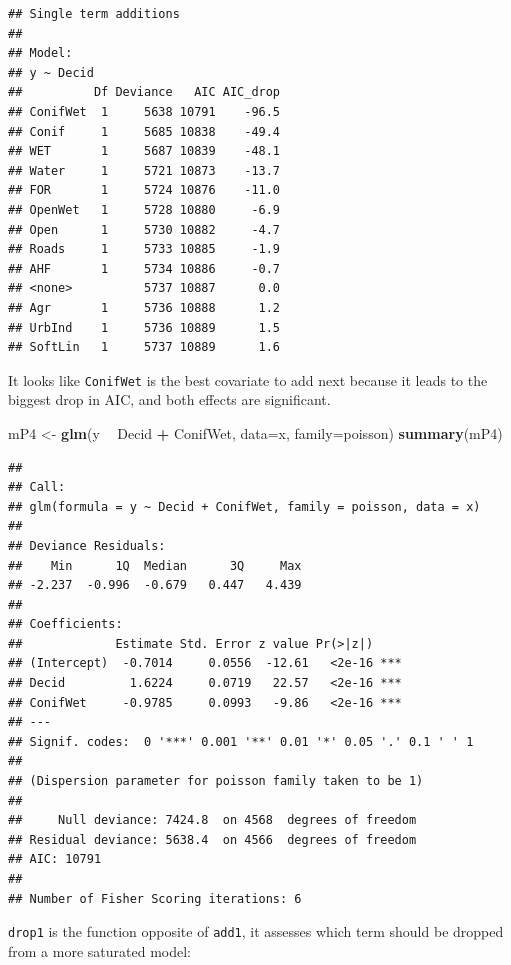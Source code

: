 \documentclass[12pt,]{book}
\newenvironment{Shaded}{\begin{snugshade}}{\end{snugshade}}
\newcommand{\DataTypeTok}[1]{\textcolor[rgb]{0.13,0.29,0.53}{#1}}
\newcommand{\KeywordTok}[1]{\textcolor[rgb]{0.13,0.29,0.53}{\textbf{#1}}}
\newcommand{\NormalTok}[1]{#1}
\newcommand{\OperatorTok}[1]{\textcolor[rgb]{0.81,0.36,0.00}{\textbf{#1}}}
\newcommand{\StringTok}[1]{\textcolor[rgb]{0.31,0.60,0.02}{#1}}
\begin{document}
\begin{verbatim}
## Single term additions
## 
## Model:
## y ~ Decid
##          Df Deviance   AIC AIC_drop
## ConifWet  1     5638 10791    -96.5
## Conif     1     5685 10838    -49.4
## WET       1     5687 10839    -48.1
## Water     1     5721 10873    -13.7
## FOR       1     5724 10876    -11.0
## OpenWet   1     5728 10880     -6.9
## Open      1     5730 10882     -4.7
## Roads     1     5733 10885     -1.9
## AHF       1     5734 10886     -0.7
## <none>          5737 10887      0.0
## Agr       1     5736 10888      1.2
## UrbInd    1     5736 10889      1.5
## SoftLin   1     5737 10889      1.6
\end{verbatim}

It looks like \texttt{ConifWet} is the best covariate to add next because it leads to the biggest drop in AIC,
and both effects are significant.

\begin{Shaded}
\begin{Highlighting}[]
\NormalTok{mP4 <-}\StringTok{ }\KeywordTok{glm}\NormalTok{(y }\OperatorTok{~}\StringTok{ }\NormalTok{Decid }\OperatorTok{+}\StringTok{ }\NormalTok{ConifWet, }\DataTypeTok{data=}\NormalTok{x, }\DataTypeTok{family=}\NormalTok{poisson)}
\KeywordTok{summary}\NormalTok{(mP4)}
\end{Highlighting}
\end{Shaded}

\begin{verbatim}
## 
## Call:
## glm(formula = y ~ Decid + ConifWet, family = poisson, data = x)
## 
## Deviance Residuals: 
##    Min      1Q  Median      3Q     Max  
## -2.237  -0.996  -0.679   0.447   4.439  
## 
## Coefficients:
##             Estimate Std. Error z value Pr(>|z|)    
## (Intercept)  -0.7014     0.0556  -12.61   <2e-16 ***
## Decid         1.6224     0.0719   22.57   <2e-16 ***
## ConifWet     -0.9785     0.0993   -9.86   <2e-16 ***
## ---
## Signif. codes:  0 '***' 0.001 '**' 0.01 '*' 0.05 '.' 0.1 ' ' 1
## 
## (Dispersion parameter for poisson family taken to be 1)
## 
##     Null deviance: 7424.8  on 4568  degrees of freedom
## Residual deviance: 5638.4  on 4566  degrees of freedom
## AIC: 10791
## 
## Number of Fisher Scoring iterations: 6
\end{verbatim}

\texttt{drop1} is the function opposite of \texttt{add1}, it assesses which term should
be dropped from a more saturated model:
\end{document}
